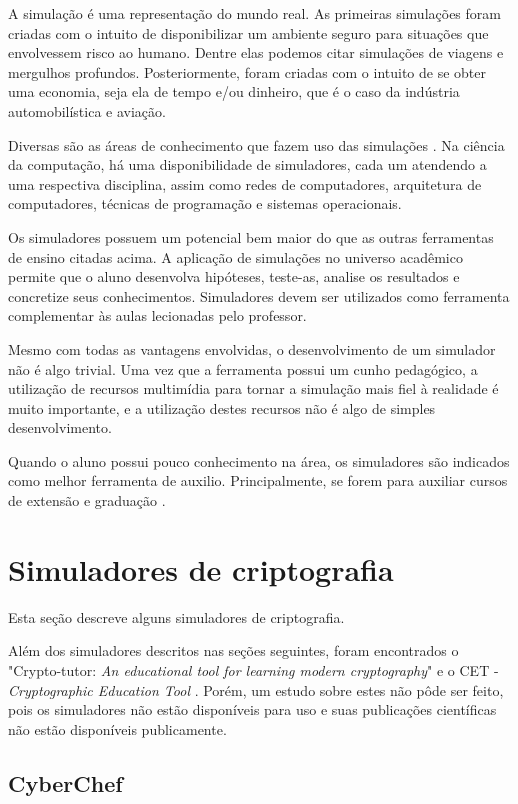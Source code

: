 A simulação é uma representação do mundo real. As primeiras simulações foram criadas com o intuito de disponibilizar um ambiente seguro para situações que envolvessem risco ao humano. Dentre elas podemos citar simulações de viagens e mergulhos profundos. Posteriormente, foram criadas com o intuito de se obter uma economia, seja ela de tempo e/ou dinheiro, que é o caso da indústria automobilística e aviação.

Diversas são as áreas de conhecimento que fazem uso das simulações \cite{banks09}. Na ciência da computação, há uma disponibilidade de simuladores, cada um atendendo a uma respectiva disciplina, assim como redes de computadores, arquitetura de computadores, técnicas de programação e sistemas operacionais.

Os simuladores possuem um potencial bem maior do que as outras ferramentas de ensino citadas acima. A aplicação de simulações no universo acadêmico permite que o aluno desenvolva hipóteses, teste-as, analise os resultados e concretize seus conhecimentos. Simuladores devem ser utilizados como ferramenta complementar às aulas lecionadas pelo professor.

Mesmo com todas as vantagens envolvidas, o desenvolvimento de um simulador não é algo trivial. Uma vez que a ferramenta possui um cunho pedagógico, a utilização de recursos multimídia para tornar a simulação mais fiel à realidade é muito importante, e a utilização destes recursos não é algo de simples desenvolvimento.

Quando o aluno possui pouco conhecimento na área, os simuladores são indicados como melhor ferramenta de auxilio. Principalmente, se forem para auxiliar cursos de extensão e graduação \cite{maia01} \cite{maia03}. 

\section{Simuladores de criptografia}
\label{sec:simuladorescriptografia}
Esta seção descreve alguns simuladores de criptografia.

Além dos simuladores descritos nas seções seguintes, foram encontrados o "Crypto-tutor: \textit{An educational tool for learning modern cryptography}" \cite{luburic16} e o CET - \textit{Cryptographic Education Tool} \cite{abuzaid11}. Porém, um estudo sobre estes não pôde ser feito, pois os simuladores não estão disponíveis para uso e suas publicações científicas não estão disponíveis publicamente.

\subsection{CyberChef}

